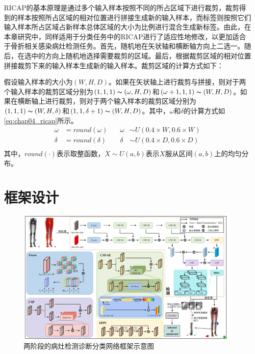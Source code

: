 RICAP的基本原理是通过多个输入样本按照不同的所占区域下进行裁剪，裁剪得到的样本按照所占区域的相对位置进行拼接生成新的输入样本，而标签则按照它们输入样本所占区域占新样本总体区域的大小为比例进行混合生成新标签。由此，在本章研究中，同样适用于分类任务中的RICAP进行了适应性地修改，以更加适合于骨折相关感染病灶检测任务。首先，随机地在矢状轴和横断轴方向上二选一。随后，在选中的方向上随机地选择需要裁剪的区域。最后，根据裁剪区域的相对位置拼接裁剪下来的输入样本生成新的输入样本。裁剪区域的计算方式如下：

假设输入样本的大小为\((W,H,D)\)。如果在矢状轴上进行裁剪与拼接，则对于两个输入样本的裁剪区域分别为\((1, 1, 1)\thicksim (\omega, H, D)\)和\((\omega + 1, 1, 1)\thicksim (W, H, D)\)。如果在横断轴上进行裁剪，则对于两个输入样本的裁剪区域分别为\((1, 1, 1)\thicksim (W, H, \delta)\)和\((1, 1, \delta + 1)\thicksim (W, H, D)\)。其中，\(\omega\)和\(\delta\)的计算方式如\ref{eq:chap04_ricap}所示。
\begin{equation}
    \begin{aligned}
        \omega & = round(\omega) & \quad \omega & \sim U(0.4\times W, 0.6 \times W) \\
        \delta & = round(\delta) & \quad \delta & \sim U(0.4\times D, 0.6 \times D) \\
    \end{aligned}
    \label{eq:chap04_ricap}
\end{equation}
其中，\(round(\cdot)\)表示取整函数，\(X \sim U(a, b)\)表示\(X\)服从区间\((a,b)\)上的均匀分布。

\section{框架设计}

\begin{figure}
    \centering
    \includegraphics[width=0.95\textheight,height=\textwidth,angle=90,keepaspectratio]{figures/chap04_model.jpg}
    \caption{两阶段的病灶检测诊断分类网络框架示意图}
    \label{fig:chap04_model}
\end{figure}

